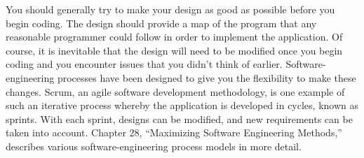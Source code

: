 You should generally try to make your design as good as possible before you begin coding. The design should provide a map of the program that any reasonable programmer could follow in order to implement the application. Of course, it is inevitable that the design will need to be modified once you begin coding and you encounter issues that you didn’t think of earlier. Software-engineering processes have been designed to give you the flexibility to make these changes. Scrum, an agile software development methodology, is one example of such an iterative process whereby the application is developed in cycles, known as sprints. With each sprint, designs can be modified, and new requirements can be taken into account. Chapter 28, “Maximizing Software Engineering Methods,” describes various software-engineering process models in more detail.































